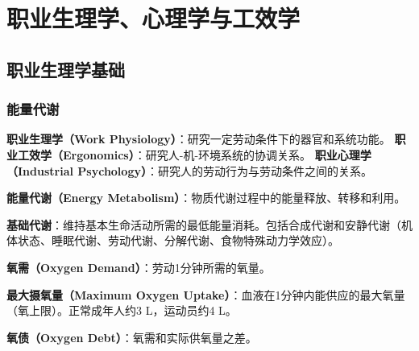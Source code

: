 \chapter{职业生理学、心理学与工效学}
\setcounter{chapter}{2}

\section{职业生理学基础}

\subsection{能量代谢}

\begin{defbox}
\textbf{职业生理学（Work Physiology）}：研究一定劳动条件下的器官和系统功能。
\textbf{职业工效学（Ergonomics）}：研究人-机-环境系统的协调关系。
\textbf{职业心理学（Industrial Psychology）}：研究人的劳动行为与劳动条件之间的关系。
\end{defbox}

\begin{defbox}
\textbf{能量代谢（Energy Metabolism）}：物质代谢过程中的能量释放、转移和利用。

\textbf{基础代谢}：维持基本生命活动所需的最低能量消耗。包括合成代谢和安静代谢（机体状态、睡眠代谢、劳动代谢、分解代谢、食物特殊动力学效应）。

\textbf{氧需（Oxygen Demand）}：劳动1分钟所需的氧量。

\textbf{最大摄氧量（Maximum Oxygen Uptake）}：血液在1分钟内能供应的最大氧量（氧上限）。正常成年人约3 L，运动员约4 L。

\textbf{氧债（Oxygen Debt）}：氧需和实际供氧量之差。
\end{defbox}

